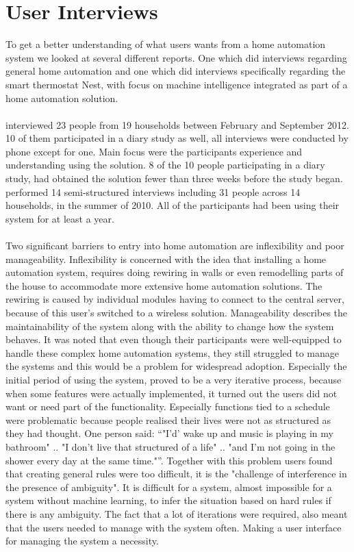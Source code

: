 \section{User Interviews}
\label{sec:interviewReports}
To get a better understanding of what users wants from a home automation system we looked at several different reports. One \cite{HAInterviews} which did interviews regarding general home automation and one which did interviews specifically regarding the smart thermostat Nest\cite{AdaptiveInterviews}, with focus on machine intelligence integrated as part of a home automation solution. 
\\\\
\cite{AdaptiveInterviews} interviewed 23 people from 19 households between February and September 2012. 10 of them participated in a diary study as well, all interviews were conducted by phone except for one. Main focus were the participants experience and understanding using the solution. 8 of the 10 people participating in a diary study, had obtained the solution fewer than three weeks before the study began. 
\cite{HAInterviews} performed 14 semi-structured interviews including 31 people across 14 households, in the summer of 2010. All of the participants had been using their system for at least a year.
\\\\
Two significant barriers to entry into home automation are inflexibility and poor manageability\cite{HAInterviews}. Inflexibility is concerned with the idea that installing a home automation system, requires doing rewiring in walls or even remodelling parts of the house to accommodate more extensive home automation solutions. The rewiring is caused by individual modules having to connect to the central server, because of this user's switched to a wireless solution\cite{HAInterviews}.
Manageability describes the maintainability of the system along with the ability to change how the system behaves. It was\cite{HAInterviews} noted that even though their participants were well-equipped to handle these complex home automation systems, they still struggled to manage the systems and this would be a problem for widespread adoption. Especially the initial period of using the system, proved to be a very iterative process, because when some features were actually implemented, it turned out the users did not want or need part of the functionality. Especially functions tied to a schedule were problematic because people realised their lives were not as structured as they had thought. One person said: \enquote{"I'd' wake up and music is playing in my bathroom" .. "I don't live that structured of a life" .. "and I'm not going in the shower every day at the same time."}. Together with this problem users found that creating general rules were too difficult, it is the "challenge of interference in the presence of ambiguity"\cite{HAInterviews}. It is difficult for a system, almost impossible for a system without machine learning, to infer the situation based on hard rules if there is any ambiguity. The fact that a lot of iterations were required, also meant that the users needed to manage with the system often. Making a user interface for managing the system a necessity.
